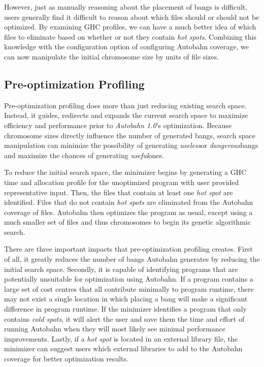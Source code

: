 \documentclass[format=sigplan]{acmart}
\newcommand{\hotspot}[0]{\textit{hot spot}}
\newcommand{\hotspots}[0]{\textit{hot spots}}
\newcommand{\coldspots}[0]{\textit{cold spots}}
\newcommand{\dangerous}[0]{\textit{dangerous}}
\newcommand{\useful}[0]{\textit{useful}}
\newcommand{\useless}[0]{\textit{useless}}
\newcommand{\Ao}[0]{\textit{Autobahn 1.0}}
\newcommand{\preopt}[0]{pre-optimization}
\newcommand{\Preopt}[0]{Pre-optimization}
\begin{document}
However, just as manually reasoning about the placement of bangs is difficult, users generally find it difficult to reason about which files should or should not be optimized. By examining GHC profiles, we can have a much better idea of which files to eliminate based on whether or not they contain \hotspots{}. Combining this knowledge with the configuration option of configuring Autobahn coverage, we can now manipulate the initial chromosome size by units of file sizes. 

\subsection{\Preopt{} Profiling}

\Preopt{} profiling does more than just reducing existing search space. Instead, it guides, redirects and expands the current search space to maximize efficiency and performance prior to \Ao{}'s optimization. Because chromosome sizes directly influence the number of generated bangs, search space manipulation can minimize the possibility of generating \useless or \dangerous bangs and maximize the chances of generating \useful ones.

To reduce the initial search space, the minimizer begins by generating a GHC time and allocation profile for the unoptimized program with user provided representative input. Then, the files that contain at least one \hotspot{} are identified. Files that do not contain \hotspots{} are eliminated from the Autobahn coverage of files. Autobahn then optimizes the program as usual, except using a much smaller set of files and thus chromosomes to begin its genetic algorithmic search. 

There are three important impacts that \preopt{} profiling creates. First of all, it greatly reduces the number of bangs Autobahn generates by reducing the initial search space. Secondly, it is capable of identifying programs that are potentially unsuitable for optimization using Autobahn. If a program contains a large set of cost centres that all contribute minimally to program runtime, there may not exist a single location in which placing a bang will make a significant difference in program runtime. If the minimizer identifies a program that only contains \coldspots{}, it will alert the user and save them the time and effort of running Autobahn when they will most likely see minimal performance improvements. Lastly, if a \hotspot{} is located in an external library file, the minimizer can suggest users which external libraries to add to the Autobahn coverage for better optimization results.
\end{document}
